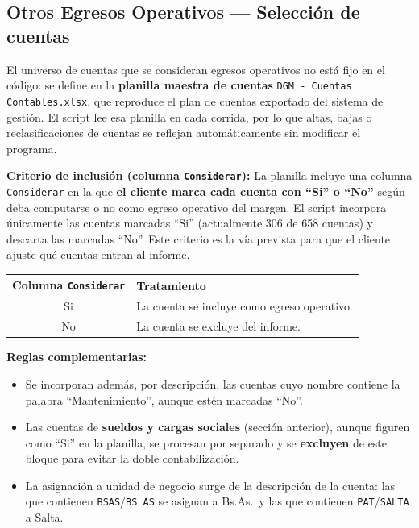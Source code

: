 \documentclass[12pt, a4paper]{article}
\begin{document}
\subsection{Otros Egresos Operativos --- Selección de cuentas}

El universo de cuentas que se consideran egresos operativos no está fijo en el código: se define en la \textbf{planilla maestra de cuentas} \texttt{DGM - Cuentas Contables.xlsx}, que reproduce el plan de cuentas exportado del sistema de gestión. El script lee esa planilla en cada corrida, por lo que altas, bajas o reclasificaciones de cuentas se reflejan automáticamente sin modificar el programa.

\textbf{Criterio de inclusión (columna \texttt{Considerar}):} La planilla incluye una columna \texttt{Considerar} en la que \textbf{el cliente marca cada cuenta con ``Si'' o ``No''} según deba computarse o no como egreso operativo del margen. El script incorpora únicamente las cuentas marcadas ``Si'' (actualmente 306 de 658 cuentas) y descarta las marcadas ``No''. Este criterio es la vía prevista para que el cliente ajuste qué cuentas entran al informe.

\vspace{0.5em}
\begin{center}
\begin{tabular}{cl}
\toprule
\rowcolor{azulclaro}
\textbf{Columna \texttt{Considerar}} & \textbf{Tratamiento} \\
\midrule
Si & La cuenta se incluye como egreso operativo. \\
\rowcolor{grisclaro}
No & La cuenta se excluye del informe. \\
\bottomrule
\end{tabular}
\end{center}
\vspace{0.5em}

\textbf{Reglas complementarias:}
\begin{itemize}
    \item Se incorporan además, por descripción, las cuentas cuyo nombre contiene la palabra ``Mantenimiento'', aunque estén marcadas ``No''.
    \item Las cuentas de \textbf{sueldos y cargas sociales} (sección anterior), aunque figuren como ``Si'' en la planilla, se procesan por separado y se \textbf{excluyen} de este bloque para evitar la doble contabilización.
    \item La asignación a unidad de negocio surge de la descripción de la cuenta: las que contienen \texttt{BSAS}/\texttt{BS AS} se asignan a Bs.As.\ y las que contienen \texttt{PAT}/\texttt{SALTA} a Salta.
\end{itemize}
\end{document}
